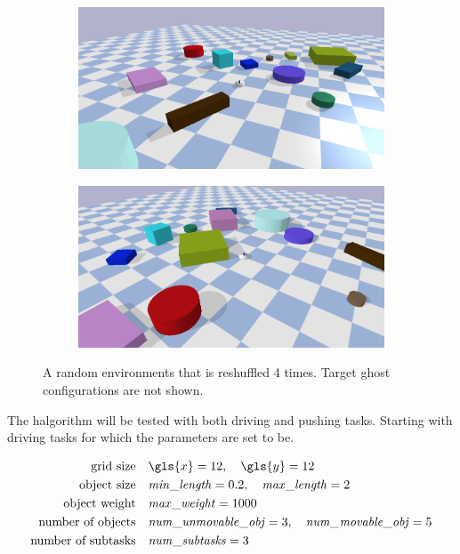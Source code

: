 \begin{figure}[H]
    \vspace{0.2cm}
    \begin{subfigure}{.49\textwidth}
    \includegraphics[width=\textwidth]{figures/tests/random3}
    \end{subfigure}
    \hfill
    \begin{subfigure}{.49\textwidth}
    \centering
    \includegraphics[width=\textwidth]{figures/tests/random4}
    \end{subfigure}
    \caption{A random environments that is reshuffled 4 times. Target ghost configurations are not shown.}
    \label{fig:random_environment_reshuffle}
\end{figure}

The \ac{halgorithm} will be tested with both driving and pushing tasks. Starting with driving tasks for which the parameters are set to be.\bs

\begin{center}
\begin{align*}
\text{grid size} \quad &\gls{x}=12, \quad \gls{y}=12 \\
\text{object size} \quad &\mathit{min\_length}=0.2, \quad \mathit{max\_length}=2 \\
\text{object weight} \quad &\mathit{max\_weight}=1000 \\
\text{number of objects} \quad &\mathit{num\_unmovable\_obj}=3, \quad \mathit{num\_movable\_obj}=5 \\
\text{number of subtasks} \quad &\mathit{num\_subtasks}=3
\end{align*}
\end{center}

